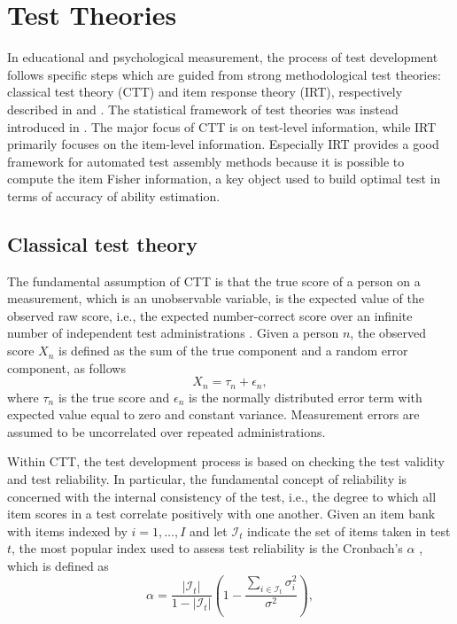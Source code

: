 \section{Test Theories}
\label{sec:TestTheories}
In educational and psychological measurement, the process of test development follows specific steps \parencite[see e.g.,][]{downing2006twelve} which are guided from strong methodological test theories: classical test theory (CTT) and item response theory (IRT), respectively described in \textcite{lord1952theory} and \textcite{Hamb85,Hamb91}. The statistical framework of test theories was instead introduced in \textcite{lord1968statistical}. The major focus of CTT is on test-level information, while IRT primarily focuses on the item-level information. Especially IRT provides a good framework for automated test assembly methods because it is possible to compute the item Fisher information, a key object used to build optimal test in terms of accuracy of ability estimation.

\subsection{Classical test theory}\label{sec:ctt}

The fundamental assumption of CTT is that the true score of a person on a measurement, which is an unobservable variable, is the expected value of the observed raw score, i.e., the expected number-correct score over an infinite number of independent test administrations \parencite{novick1966axioms,lord1968statistical}. Given a person $n$, the observed score $X_n$ is defined as the sum of the true component and a random error component, as follows
\begin{equation}
X_n = \tau_n+\epsilon_n,
\end{equation}
where $\tau_n$ is the true score and $\epsilon_n$ is the normally distributed error term with expected value equal to zero and constant variance. Measurement errors are assumed to be uncorrelated over repeated administrations.

Within CTT, the test development process is based on checking the test validity and test reliability. In particular, the fundamental concept of reliability is concerned with the internal consistency of the test, i.e., the degree to which all item scores in a test correlate positively with one another. Given an item bank with items indexed by $i=1,\ldots,I$ and let $\mathcal{I}_t$ indicate the set of items taken in test $t$, the most popular index used to assess test reliability is the Cronbach's $\alpha$ \textcite{cronbach1951coefficient}, which is defined as
\begin{equation}
\alpha= \frac{|\mathcal{I}_t|}{1-|\mathcal{I}_t|}\left(1- \frac{\sum_{i \in \mathcal{I}_t}\sigma^2_i}{\sigma^2} \right),
\end{equation}

